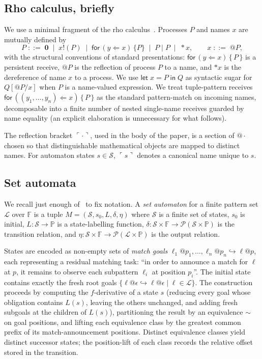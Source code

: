 \documentclass[11pt]{article}
\theoremstyle{plain}
\theoremstyle{definition}
\theoremstyle{remark}
\newcommand{\reflect}[1]{\ulcorner #1 \urcorner}
\newcommand{\Pos}{\mathbb{P}}
\newcommand{\States}{\mathcal{S}}
\newcommand{\Lhs}{\mathcal{L}}
\newcommand{\nil}{\mathbf{0}}
\newcommand{\Recv}[3]{\mathsf{for}\,(#1 \Leftarrow #2)\,\{\,#3\,\}}
\newcommand{\Let}[3]{\mathsf{let}\;#1 = #2\;\mathsf{in}\;#3}
\begin{document}
\subsection{Rho calculus, briefly}

We use a minimal fragment of the rho calculus~\cite{MeredithRadestock2005}.
Processes $P$ and names $x$ are mutually defined by
\[
  P \;::=\; \nil \;\mid\; x!(P) \;\mid\; \mathsf{for}\,(y \Leftarrow x)\,\{P\}
       \;\mid\; P \mid P \;\mid\; *x,
  \qquad
  x \;::=\; @P,
\]
with the structural conventions of standard presentations: $\Recv{y}{x}{P}$
is a persistent receive, $@P$ is the reflection of process $P$ to a name,
and $*x$ is the dereference of name $x$ to a process. We use
$\Let{x}{P}{Q}$ as syntactic sugar for $Q[@P/x]$ when $P$ is a name-valued
expression. We treat tuple-pattern receives
$\Recv{(y_{1}, \ldots, y_{n})}{x}{P}$ as the standard pattern-match on
incoming names, decomposable into a finite number of nested single-name
receives guarded by name equality (an explicit elaboration is unnecessary
for what follows).

The reflection bracket $\reflect{\cdot}$, used in the body of the paper, is
a section of $@\cdot$ chosen so that distinguishable mathematical objects
are mapped to distinct names. For automaton states $s \in \States$,
$\reflect{s}$ denotes a canonical name unique to $s$.

\subsection{Set automata}\label{ssec:set-automata}

We recall just enough of~\cite{BouwmanErkens2022,ErkensGroote2021} to fix
notation. A \emph{set automaton} for a finite pattern set $\Lhs$ over
$\mathbb{F}$ is a tuple
$M = (\States, s_{0}, L, \delta, \eta)$ where $\States$ is a finite set of
states, $s_{0}$ is initial, $L : \States \to \Pos$ is a state-labelling
function, $\delta : \States \times \mathbb{F} \to \mathcal{P}(\States \times \Pos)$
is the transition relation, and
$\eta : \States \times \mathbb{F} \to \mathcal{P}(\Lhs \times \Pos)$ is the
output relation.

States are encoded as non-empty sets of \emph{match goals}
$\ell_{1}@p_{1}, \ldots, \ell_{n}@p_{n} \hookrightarrow \ell@p$, each
representing a residual matching task: ``in order to announce a match for
$\ell$ at $p$, it remains to observe each subpattern $\ell_{i}$ at
position $p_{i}$''. The initial state contains exactly the fresh root
goals $\{\ell@\epsilon \hookrightarrow \ell@\epsilon \mid \ell \in \Lhs\}$.
The construction proceeds by computing the $f$-derivative of a state $s$
(reducing every goal whose obligation contains $L(s)$, leaving the others
unchanged, and adding fresh subgoals at the children of $L(s)$),
partitioning the result by an equivalence $\sim$ on goal positions,
and lifting each equivalence class by the greatest common prefix of its
match-announcement positions. Distinct equivalence classes yield distinct
successor states; the position-lift of each class records the relative
offset stored in the transition.
\end{document}
